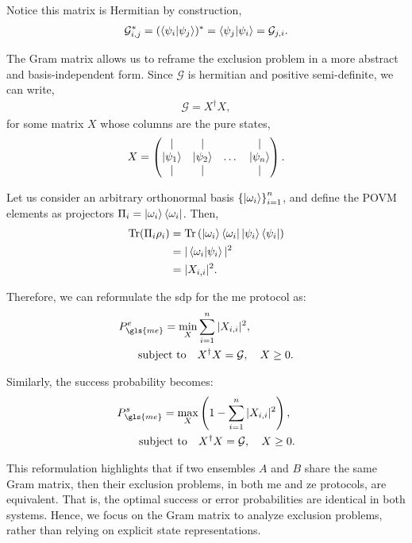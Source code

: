 \documentclass[12pt,letterpaper]{article}
\DeclareMathOperator{\tr}{Tr}
\begin{document}
\begin{multicols}{2}
Notice this matrix is Hermitian by construction,
\begin{align*}
\mathcal{G}_{i,j}^* = (\braket{\psi_i|\psi_j})^* = \braket{\psi_j|\psi_i} = \mathcal{G}_{j,i}.
\end{align*}

The Gram matrix allows us to reframe the exclusion problem in a more abstract and basis-independent form. Since $\mathcal{G}$ is hermitian and positive semi-definite, we can write,
\begin{align*}
\mathcal{G} = X^\dagger X,
\end{align*}
for some matrix $X$ whose columns are the pure states,
\begin{align*}
	X = \begin{pmatrix}
		\mid & \mid &        & \mid \\
		\ket{\psi_1} & \ket{\psi_2} & \dots & \ket{\psi_n} \\
		\mid & \mid &        & \mid
	\end{pmatrix}.
\end{align*}

Let us consider an arbitrary orthonormal basis $\left\{\ket{\omega_i}\right\}_{i=1}^n$, and define the POVM elements as projectors $\Pi_i = \ket{\omega_i}\bra{\omega_i}$. Then,
\begin{align*}
	\tr(\Pi_i \rho_i) &= \tr\left( \ket{\omega_i}\bra{\omega_i} \ket{\psi_i}\bra{\psi_i} \right) \\
	&= |\braket{\omega_i|\psi_i}|^2 \\
	&= |X_{i,i}|^2.
\end{align*}

Therefore, we can reformulate the \gls{sdp} for the \gls{me} protocol as:
\begin{align*}
	P_{\gls{me}}^e = \min_{X} &\sum_{i=1}^n |X_{i,i}|^2,\\
	\text{subject to} \quad & X^\dagger X = \mathcal{G}, \quad X \geq 0.
\end{align*}

Similarly, the success probability becomes:
\begin{align*}
	P_{\gls{me}}^s = \max_{X} &\left(1 - \sum_{i=1}^n |X_{i,i}|^2\right),\\
	\text{subject to} \quad & X^\dagger X = \mathcal{G}, \quad X \geq 0.
\end{align*}

This reformulation highlights that if two ensembles $A$ and $B$ share the same Gram matrix, then their exclusion problems, in both \gls{me} and \gls{ze} protocols, are equivalent. That is, the optimal success or error probabilities are identical in both systems. Hence, we focus on the Gram matrix to analyze exclusion problems, rather than relying on explicit state representations.

\end{multicols}
\end{document}
